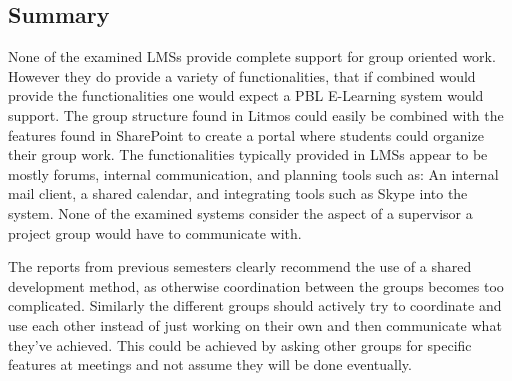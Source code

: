 \subsection{Summary}
None of the examined LMSs provide complete support for group oriented work.
However they do provide a variety of functionalities, that if combined would provide the functionalities one would expect a PBL E-Learning system would support.
The group structure found in Litmos could easily be combined with the features found in SharePoint to create a portal where students could organize their group work.
The functionalities typically provided in LMSs appear to be mostly forums, internal communication, and planning tools such as: An internal mail client, a shared calendar, and integrating tools such as Skype into the system.
None of the examined systems consider the aspect of a supervisor a project group would have to communicate with.

The reports from previous semesters clearly recommend the use of a shared development method, as otherwise coordination between the groups becomes too complicated. Similarly the different groups should actively try to coordinate and use each other instead of just working on their own and then communicate what they've achieved. 
This could be achieved by asking other groups for specific features at meetings and not assume they will be done eventually.

